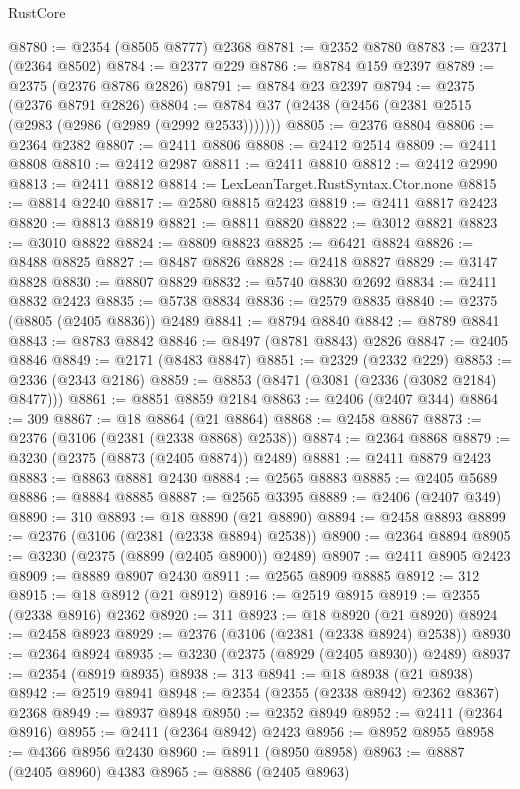 \begin{lexlean}{RustCore}
\begin{coremodule}
@8780 := @2354 (@8505 @8777) @2368
@8781 := @2352 @8780
@8783 := @2371 (@2364 @8502)
@8784 := @2377 @229
@8786 := @8784 @159 @2397
@8789 := @2375 (@2376 @8786 @2826)
@8791 := @8784 @23 @2397
@8794 := @2375 (@2376 @8791 @2826)
@8804 := @8784 @37 (@2438 (@2456 (@2381 @2515 (@2983 (@2986 (@2989 (@2992 @2533)))))))
@8805 := @2376 @8804
@8806 := @2364 @2382
@8807 := @2411 @8806
@8808 := @2412 @2514
@8809 := @2411 @8808
@8810 := @2412 @2987
@8811 := @2411 @8810
@8812 := @2412 @2990
@8813 := @2411 @8812
@8814 := LexLeanTarget.RustSyntax.Ctor.none
@8815 := @8814 @2240
@8817 := @2580 @8815 @2423
@8819 := @2411 @8817 @2423
@8820 := @8813 @8819
@8821 := @8811 @8820
@8822 := @3012 @8821
@8823 := @3010 @8822
@8824 := @8809 @8823
@8825 := @6421 @8824
@8826 := @8488 @8825
@8827 := @8487 @8826
@8828 := @2418 @8827
@8829 := @3147 @8828
@8830 := @8807 @8829
@8832 := @5740 @8830 @2692
@8834 := @2411 @8832 @2423
@8835 := @5738 @8834
@8836 := @2579 @8835
@8840 := @2375 (@8805 (@2405 @8836)) @2489
@8841 := @8794 @8840
@8842 := @8789 @8841
@8843 := @8783 @8842
@8846 := @8497 (@8781 @8843) @2826
@8847 := @2405 @8846
@8849 := @2171 (@8483 @8847)
@8851 := @2329 (@2332 @229)
@8853 := @2336 (@2343 @2186)
@8859 := @8853 (@8471 (@3081 (@2336 (@3082 @2184) @8477)))
@8861 := @8851 @8859 @2184
@8863 := @2406 (@2407 @344)
@8864 := 309
@8867 := @18 @8864 (@21 @8864)
@8868 := @2458 @8867
@8873 := @2376 (@3106 (@2381 (@2338 @8868) @2538))
@8874 := @2364 @8868
@8879 := @3230 (@2375 (@8873 (@2405 @8874)) @2489)
@8881 := @2411 @8879 @2423
@8883 := @8863 @8881 @2430
@8884 := @2565 @8883
@8885 := @2405 @5689
@8886 := @8884 @8885
@8887 := @2565 @3395
@8889 := @2406 (@2407 @349)
@8890 := 310
@8893 := @18 @8890 (@21 @8890)
@8894 := @2458 @8893
@8899 := @2376 (@3106 (@2381 (@2338 @8894) @2538))
@8900 := @2364 @8894
@8905 := @3230 (@2375 (@8899 (@2405 @8900)) @2489)
@8907 := @2411 @8905 @2423
@8909 := @8889 @8907 @2430
@8911 := @2565 @8909 @8885
@8912 := 312
@8915 := @18 @8912 (@21 @8912)
@8916 := @2519 @8915
@8919 := @2355 (@2338 @8916) @2362
@8920 := 311
@8923 := @18 @8920 (@21 @8920)
@8924 := @2458 @8923
@8929 := @2376 (@3106 (@2381 (@2338 @8924) @2538))
@8930 := @2364 @8924
@8935 := @3230 (@2375 (@8929 (@2405 @8930)) @2489)
@8937 := @2354 (@8919 @8935)
@8938 := 313
@8941 := @18 @8938 (@21 @8938)
@8942 := @2519 @8941
@8948 := @2354 (@2355 (@2338 @8942) @2362 @8367) @2368
@8949 := @8937 @8948
@8950 := @2352 @8949
@8952 := @2411 (@2364 @8916)
@8955 := @2411 (@2364 @8942) @2423
@8956 := @8952 @8955
@8958 := @4366 @8956 @2430
@8960 := @8911 (@8950 @8958)
@8963 := @8887 (@2405 @8960) @4383
@8965 := @8886 (@2405 @8963)

\end{coremodule}
\end{lexlean}
